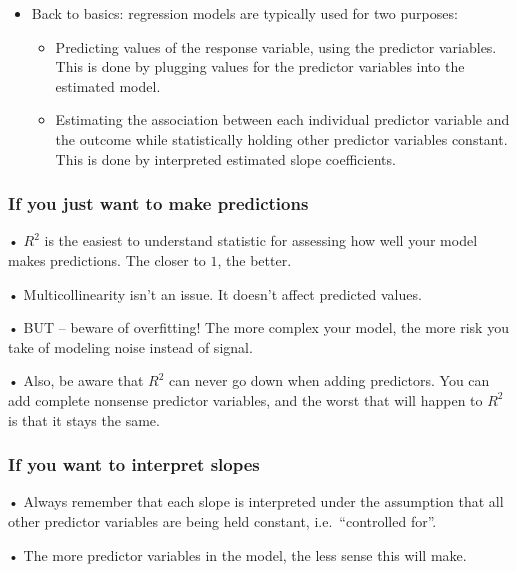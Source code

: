 \documentclass[
  letterpaper,
  DIV=11,
  numbers=noendperiod]{scrreprt}
\begin{document}
\begin{itemize}
\item
  Back to basics: regression models are typically used for two purposes:

  \begin{itemize}
  \item
    Predicting values of the response variable, using the predictor
    variables. This is done by plugging values for the predictor
    variables into the estimated model.
  \item
    Estimating the association between each individual predictor
    variable and the outcome while statistically holding other predictor
    variables constant. This is done by interpreted estimated slope
    coefficients.
  \end{itemize}
\end{itemize}

\hypertarget{if-you-just-want-to-make-predictions}{%
\subsubsection{If you just want to make
predictions}\label{if-you-just-want-to-make-predictions}}

• \(R^2\) is the easiest to understand statistic for assessing how well
your model makes predictions. The closer to \(1\), the better.

• Multicollinearity isn't an issue. It doesn't affect predicted values.

• BUT -- beware of overfitting! The more complex your model, the more
risk you take of modeling noise instead of signal.

• Also, be aware that \(R^2\) can never go down when adding predictors.
You can add complete nonsense predictor variables, and the worst that
will happen to \(R^2\) is that it stays the same.

\hypertarget{if-you-want-to-interpret-slopes}{%
\subsubsection{If you want to interpret
slopes}\label{if-you-want-to-interpret-slopes}}

• Always remember that each slope is interpreted under the assumption
that all other predictor variables are being held constant,
i.e.~``controlled for''.

• The more predictor variables in the model, the less sense this will
make.
\end{document}
